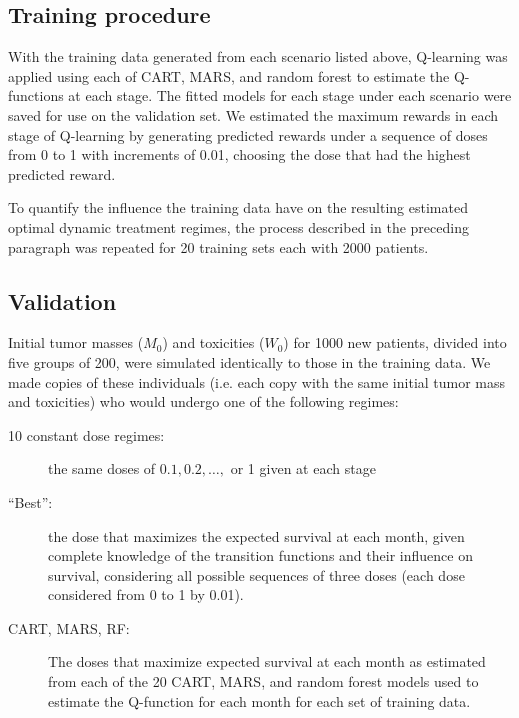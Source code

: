 \documentclass[12pt]{article}
\begin{document}
\subsection{Training procedure} %
\label{sub:procedure}

With the training data generated from each scenario listed above, Q-learning was applied using each of CART, MARS, and random forest to estimate the Q-functions at each stage. The fitted models for each stage under each scenario were saved for use on the validation set. We estimated the maximum rewards in each stage of Q-learning by generating predicted rewards under a sequence of doses from 0 to 1 with increments of 0.01, choosing the dose that had the highest predicted reward.

To quantify the influence the training data have on the resulting estimated optimal dynamic treatment regimes, the process described in the preceding paragraph was repeated for 20 training sets each with 2000 patients.


\subsection{Validation} %
\label{sub:validation}

Initial tumor masses ($M_{0}$) and toxicities ($W_{0}$) for 1000 new patients, divided into five groups of 200, were simulated identically to those in the training data. We made copies of these individuals (i.e. each copy with the same initial tumor mass and toxicities) who would undergo one of the following regimes:

\begin{description}
  \item [10 constant dose regimes:] the same doses of $0.1, 0.2, \ldots,$ or 1 given at each stage
  \item [``Best'':] the dose that maximizes the expected survival at each month, given complete knowledge of the transition functions and their influence on survival, considering all possible sequences of three doses (each dose considered from 0 to 1 by 0.01).
  \item [CART, MARS, RF:] The doses that maximize expected survival at each month as estimated from each of the 20 CART, MARS, and random forest models used to estimate the Q-function for each month for each set of training data.
\end{description}
\end{document}
